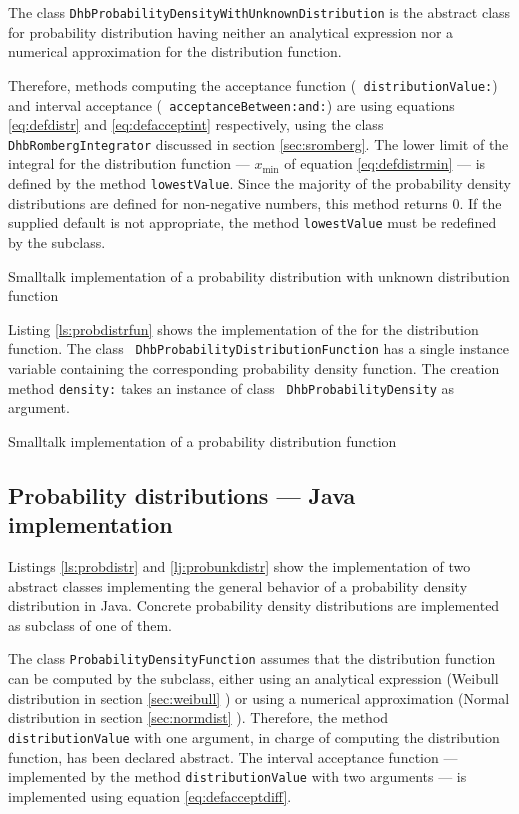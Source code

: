\documentclass[twoside]{book}
\begin{document}
The class {\tt DhbProbabilityDensityWithUnknownDistribution} is
the abstract class for probability distribution having neither an
analytical expression nor a numerical approximation for the
distribution function.

Therefore, methods computing the acceptance function ({\tt
distributionValue:}) and interval acceptance ({\tt
acceptanceBetween:and:}) are using equations \ref{eq:defdistr} and
\ref{eq:defacceptint} respectively, using the class {\tt
DhbRombergIntegrator} discussed in section \ref{sec:sromberg}. The
lower limit of the integral for the distribution function ---
$x_{\min}$ of equation \ref{eq:defdistrmin} --- is defined by the
method {\tt lowestValue}. Since the majority of the probability
density distributions are defined for non-negative numbers, this
method returns 0. If the supplied default is not appropriate, the
method {\tt lowestValue} must be redefined by the subclass.

\begin{listing} Smalltalk implementation of a probability distribution with unknown
distribution function\label{ls:probunkdistr}

\end{listing}

Listing \ref{ls:probdistrfun} shows the implementation of the
 for the distribution function. The class {\tt
DhbProbabilityDistributionFunction} has a single instance variable
containing the corresponding probability density function. The
creation method {\tt density:} takes an instance of class {\tt
DhbProbabilityDensity} as argument.

\begin{listing} Smalltalk implementation of a probability distribution function
\label{ls:probdistrfun}

\end{listing}

\subsection{Probability distributions --- Java implementation}
Listings \ref{ls:probdistr} and \ref{lj:probunkdistr} show the
implementation of two abstract classes implementing the general
behavior of a probability density distribution in Java. Concrete
probability density distributions are implemented as subclass of
one of them.

The class {\tt ProbabilityDensityFunction} assumes that the
distribution function can be computed by the subclass, either
using an analytical expression (Weibull distribution in section
\ref{sec:weibull} \eg) or using a numerical approximation (Normal
distribution in section \ref{sec:normdist}  \eg). Therefore, the
method {\tt distributionValue} with one argument, in charge of
computing the distribution function, has been declared abstract.
The interval acceptance function --- implemented by the method
{\tt distributionValue} with two arguments --- is implemented
using equation \ref{eq:defacceptdiff}.
\end{document}
